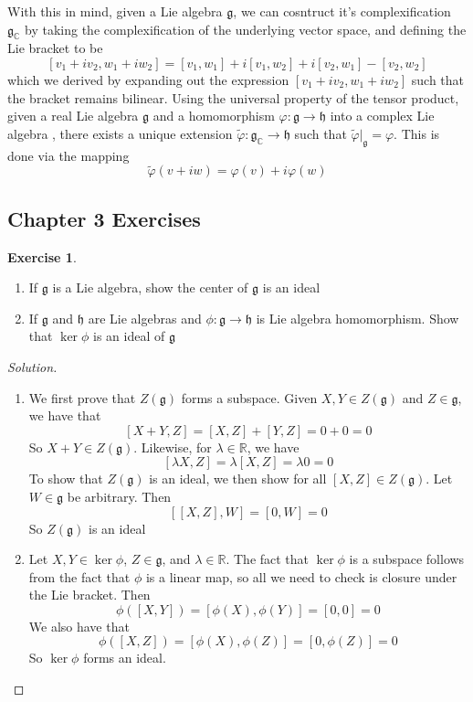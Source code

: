 \documentclass[psamsfonts]{amsart}
\theoremstyle{definition}
\newtheorem{exer}[thm]{Exercise}
\theoremstyle{remark}
\newcommand{\R}{\mathbb{R}}
\newcommand{\C}{\mathbb{C}}
\newcommand{\g}{\mathfrak{g}}
\newcommand{\bra}[2]{ \left[ #1, #2 \right] }
\begin{document}
With this in mind, given a Lie algebra $\g$, we can cosntruct it's complexification $\g_\C$ by taking the complexification of the underlying vector space, and defining the Lie bracket to be 
$$\bra{v_1 + iv_2}{w_1 + iw_2} = \bra{v_1}{w_1} + i\bra{v_1}{w_2} + i\bra{v_2}{w_1} - \bra{v_2}{w_2} $$
which we derived by expanding out the expression $\bra{v_1 + iv_2}{w_1 + iw_2}$ such that the bracket remains bilinear. Using the  universal property of the tensor product, given a real Lie algebra $\g$ and a homomorphism $\varphi: \g \to \mathfrak{h}$ into a complex Lie algebra , there exists a unique extension $\tilde{\varphi}: \g_\C \to \mathfrak{h}$ such that $\tilde{\varphi}\big\vert_\g = \varphi$. This is done via the mapping
$$\tilde{\varphi}(v + iw) = \varphi(v) + i\varphi(w) $$

\subsection*{Chapter 3 Exercises}
\setcounter{thm}{0}
\begin{exer}\ \\ \vspace{-\baselineskip}
\begin{enumerate}
\item If $\g$ is a Lie algebra, show the center of $\g$ is an ideal
\item If $\g$ and $\mathfrak{h}$ are Lie algebras and $\phi: \g \to \mathfrak{h}$ is Lie algebra homomorphism. Show that $\ker \phi$ is an ideal of $\g$
\end{enumerate}
\end{exer}

\begin{proof}[Solution]\ \\ \vspace{-\baselineskip}
\begin{enumerate}
\item We first prove that $Z(\g)$ forms a subspace. Given $X,Y \in Z(\g)$ and $Z \in \g$, we have that 
$$\bra{X+Y}{Z} = \bra{X}{Z} + \bra{Y}{Z} = 0 + 0 = 0$$
So $X+ Y \in Z(\g)$. Likewise, for $\lambda \in \R$, we have 
$$\bra{\lambda X}{Z} = \lambda\bra{X}{Z} = \lambda 0 = 0 $$
To show that $Z(\g)$ is an ideal, we then show for all $\bra{X}{Z} \in Z(\g)$. Let $W \in \g$ be arbitrary. Then
$$\bra{\bra{X}{Z}}{W} = \bra{0}{W} = 0 $$
So $Z(\g)$ is an ideal
\item Let $X,Y \in \ker \phi$, $Z \in \g$, and $\lambda \in \R$. The fact that $\ker \phi$ is a subspace follows from the fact that $\phi$ is a linear map, so all we need to check is closure under the Lie bracket. Then
$$\phi\left( \bra{X}{Y} \right) = \bra{\phi(X)}{\phi(Y)} = \bra{0}{0} = 0 $$
We also have that 
$$\phi \left(  \bra{X}{Z}\right ) = \bra{\phi(X)}{\phi(Z)} = \bra{0}{\phi(Z)} = 0$$
So $\ker \phi$ forms an ideal.
\end{enumerate}
\end{proof}
\end{document}
